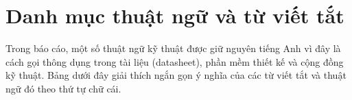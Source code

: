 \chapter*{Danh mục thuật ngữ và từ viết tắt}

Trong báo cáo, một số thuật ngữ kỹ thuật được giữ nguyên tiếng Anh vì đây là cách gọi thông dụng trong tài liệu (datasheet), phần mềm thiết kế và cộng đồng kỹ thuật. Bảng dưới đây giải thích ngắn gọn ý nghĩa của các từ viết tắt và thuật ngữ đó theo thứ tự chữ cái.


